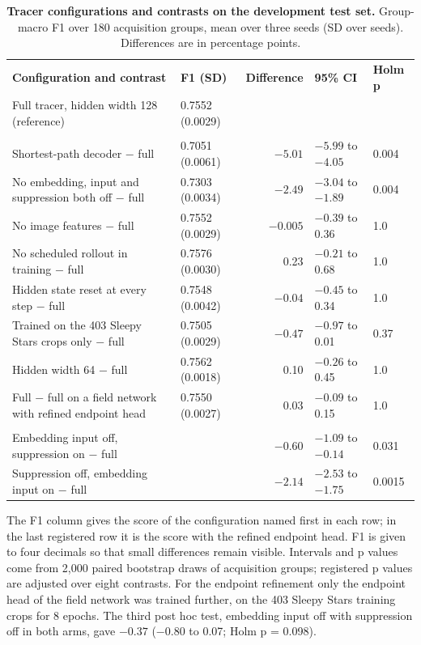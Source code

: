\begin{table}[!htbp]
\centering
\caption{\textbf{Tracer configurations and contrasts on the development test set.} Group-macro F1 over 180 acquisition groups, mean over three seeds (SD over seeds). Differences are in percentage points.}
\label{tab:contrasts}
{\footnotesize
\setlength{\tabcolsep}{3.5pt}
\begin{tabular}{|>{\raggedright\arraybackslash}p{2.55in}|l|r|l|l|}
\hline
\textbf{Configuration and contrast} & \textbf{F1 (SD)} & \textbf{Difference} & \textbf{95\% CI} & \textbf{Holm p} \\ \thickhline
Full tracer, hidden width 128 (reference) & 0.7552 (0.0029) & & & \\ \thickhline
\multicolumn{5}{|l|}{\textbf{Registered contrasts}} \\ \hline
Shortest-path decoder $-$ full & 0.7051 (0.0061) & $-5.01$ & $-5.99$ to $-4.05$ & 0.004 \\ \hline
No embedding, input and suppression both off $-$ full & 0.7303 (0.0034) & $-2.49$ & $-3.04$ to $-1.89$ & 0.004 \\ \hline
No image features $-$ full & 0.7552 (0.0029) & $-0.005$ & $-0.39$ to 0.36 & 1.0 \\ \hline
No scheduled rollout in training $-$ full & 0.7576 (0.0030) & 0.23 & $-0.21$ to 0.68 & 1.0 \\ \hline
Hidden state reset at every step $-$ full & 0.7548 (0.0042) & $-0.04$ & $-0.45$ to 0.34 & 1.0 \\ \hline
Trained on the 403 Sleepy Stars crops only $-$ full & 0.7505 (0.0029) & $-0.47$ & $-0.97$ to 0.01 & 0.37 \\ \hline
Hidden width 64 $-$ full & 0.7562 (0.0018) & 0.10 & $-0.26$ to 0.45 & 1.0 \\ \hline
Full $-$ full on a field network with refined endpoint head & 0.7550 (0.0027) & 0.03 & $-0.09$ to 0.15 & 1.0 \\ \thickhline
\multicolumn{5}{|l|}{\textbf{Post hoc contrasts (CPU decoding, Holm over three tests)}} \\ \hline
Embedding input off, suppression on $-$ full & & $-0.60$ & $-1.09$ to $-0.14$ & 0.031 \\ \hline
Suppression off, embedding input on $-$ full & & $-2.14$ & $-2.53$ to $-1.75$ & 0.0015 \\ \hline
\end{tabular}
}
\begin{flushleft}\small
The F1 column gives the score of the configuration named first in each row; in the last registered row it is the score with the refined endpoint head.
F1 is given to four decimals so that small differences remain visible.
Intervals and p values come from 2,000 paired bootstrap draws of acquisition groups; registered p values are adjusted over eight contrasts.
For the endpoint refinement only the endpoint head of the field network was trained further, on the 403 Sleepy Stars training crops for 8 epochs.
The third post hoc test, embedding input off with suppression off in both arms, gave $-0.37$ ($-0.80$ to 0.07; Holm p = 0.098).
\end{flushleft}
\end{table}


